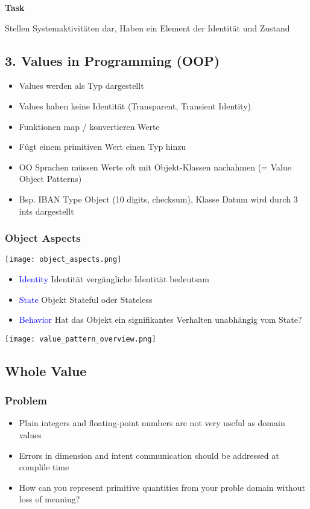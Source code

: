 \textbf{Task}

Stellen Systemaktivitäten dar, Haben ein Element der Identität und Zustand

\subsection{3. Values in Programming (OOP)}

\begin{itemize}
    \item Values werden als Typ dargestellt
    \item Values haben keine Identität (Transparent, Transient Identity)
    \item Funktionen map / konvertieren Werte
    \item Fügt einem primitiven Wert einen Typ hinzu
    \item OO Sprachen müssen Werte oft mit Objekt-Klassen nachahmen (= Value Object Patterns)
    \item Bsp. IBAN Type Object (10 digits, checksum), Klasse Datum wird durch 3 ints dargestellt
\end{itemize}

\subsubsection{Object Aspects}
\texttt{[image: object\_aspects.png]}

\begin{itemize}
    \item \textcolor{blue}{Identity} Identität vergängliche Identität bedeutsam
    \item \textcolor{blue}{State} Objekt Stateful oder Stateless
    \item \textcolor{blue}{Behavior} Hat das Objekt ein signifikantes Verhalten unabhängig vom State?
\end{itemize}

\texttt{[image: value\_pattern\_overview.png]}

\subsection{Whole Value}
\subsubsection{Problem}
\begin{itemize}
    \item Plain integers and floating-point numbers are not very useful as domain values
    \item Errors in dimension and intent communication should be addressed at complile time
    \item How can you represent primitive quantities from your proble domain without loss of meaning?
\end{itemize}

